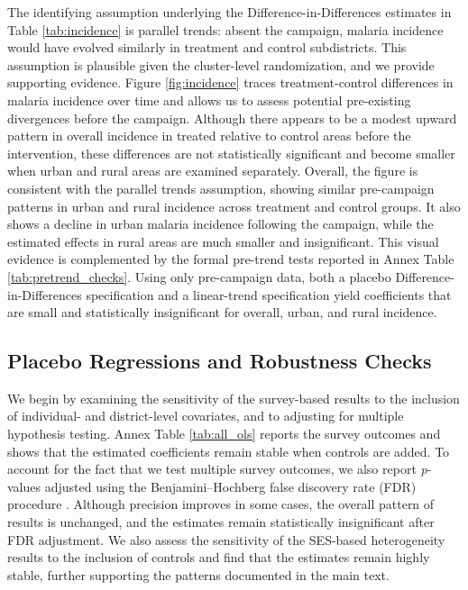 The identifying assumption underlying the Difference-in-Differences estimates in Table \ref{tab:incidence} is parallel trends: absent the campaign, malaria incidence would have evolved similarly in treatment and control subdistricts. This assumption is plausible given the cluster-level randomization, and we provide supporting evidence. Figure \ref{fig:incidence} traces treatment-control differences in malaria incidence over time and allows us to assess potential pre-existing divergences before the campaign. Although there appears to be a modest upward pattern in overall incidence in treated relative to control areas before the intervention, these differences are not statistically significant and become smaller when urban and rural areas are examined separately. Overall, the figure is consistent with the parallel trends assumption, showing similar pre-campaign patterns in urban and rural incidence across treatment and control groups. It also shows a decline in urban malaria incidence following the campaign, while the estimated effects in rural areas are much smaller and insignificant. This visual evidence is complemented by the formal pre-trend tests reported in Annex Table \ref{tab:pretrend_checks}. Using only pre-campaign data, both a placebo Difference-in-Differences specification and a linear-trend specification yield coefficients that are small and statistically insignificant for overall, urban, and rural incidence.




\subsection{Placebo Regressions and Robustness Checks}
We begin by examining the sensitivity of the survey-based results to the inclusion of individual- and district-level covariates, and to adjusting for multiple hypothesis testing. Annex Table \ref{tab:all_ols} reports the survey outcomes and shows that the estimated coefficients remain stable when controls are added. To account for the fact that we test multiple survey outcomes, we also report \textit{p}-values adjusted using the Benjamini--Hochberg false discovery rate (FDR) procedure \citep{benjamini1995controlling}. Although precision improves in some cases, the overall pattern of results is unchanged, and the estimates remain statistically insignificant after FDR adjustment. We also assess the sensitivity of the SES-based heterogeneity results to the inclusion of controls and find that the estimates remain highly stable, further supporting the patterns documented in the main text.%


